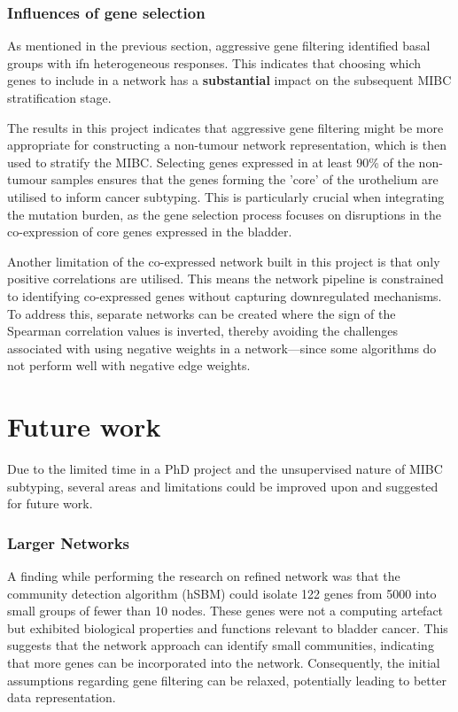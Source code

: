 \subsubsection*{Influences of gene selection}

As mentioned in the previous section, aggressive gene filtering identified basal groups with \acrshort{ifn} heterogeneous responses. This indicates that choosing which genes to include in a network has a \textbf{substantial} impact on the subsequent MIBC stratification stage.

The results in this project indicates that aggressive gene filtering might be more appropriate for constructing a non-tumour network representation, which is then used to stratify the MIBC. Selecting genes expressed in at least 90\% of the non-tumour samples ensures that the genes forming the 'core' of the urothelium are utilised to inform cancer subtyping. This is particularly crucial when integrating the mutation burden, as the gene selection process focuses on disruptions in the co-expression of core genes expressed in the bladder.

Another limitation of the co-expressed network built in this project is that only positive correlations are utilised. This means the network pipeline is constrained to identifying co-expressed genes without capturing downregulated mechanisms. To address this, separate networks can be created where the sign of the Spearman correlation values is inverted, thereby avoiding the challenges associated with using negative weights in a network—since some algorithms do not perform well with negative edge weights.


\section{Future work} \label{s:future_work}

Due to the limited time in a PhD project and the unsupervised nature of MIBC subtyping, several areas and limitations could be improved upon and suggested for future work.

\subsubsection*{Larger Networks}

A finding while performing the research on refined network was that the community detection algorithm (hSBM) could isolate 122 genes from 5000 into small groups of fewer than 10 nodes. These genes were not a computing artefact but exhibited biological properties and functions relevant to bladder cancer. This suggests that the network approach can identify small communities, indicating that more genes can be incorporated into the network. Consequently, the initial assumptions regarding gene filtering can be relaxed, potentially leading to better data representation.


